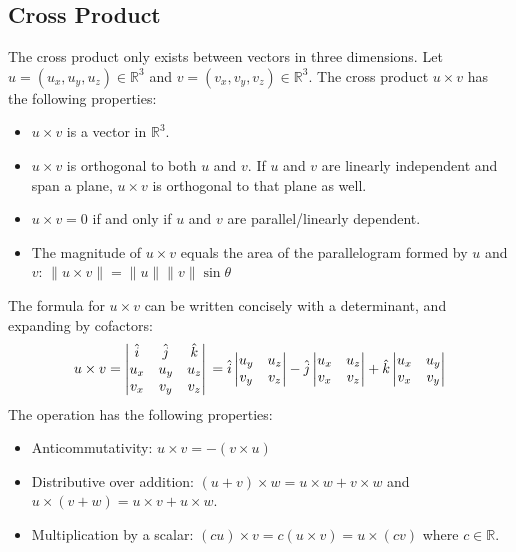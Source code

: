 \documentclass{article}
\begin{document}
\subsection{Cross Product}
The cross product only exists between vectors in three dimensions. Let $u=(u_x,u_y,u_z)\in\mathbb R^3$ and $v=(v_x,v_y,v_z)\in\mathbb R^3$. The cross product $u\times v$ has the following properties:
\begin{itemize}
	\item $u\times v$ is a vector in $\mathbb R^3$.
	\item $u\times v$ is orthogonal to both $u$ and $v$. If $u$ and $v$ are linearly independent and span a plane, $u\times v$ is orthogonal to that plane as well.
	\item $u\times v=0$ if and only if $u$ and $v$ are parallel/linearly dependent.
	\item The magnitude of $u\times v$ equals the area of the parallelogram formed by $u$ and $v$: $\lVert u\times v \rVert =\lVert u \rVert \lVert v \rVert \sin\theta$
\end{itemize}
The formula for $u\times v$ can be written concisely with a determinant, and expanding by cofactors:
\begin{equation*}
    u\times v 
	=\begin{vmatrix}
		\hat i & \hat j & \hat k \\
		u_x & u_y & u_z \\
		v_x & v_y & v_z \\
	\end{vmatrix} \\
	=\hat i \begin{vmatrix}
		u_y & u_z \\
		v_y & v_z
	\end{vmatrix}
	-\hat j \begin{vmatrix}
		u_x & u_z \\
		v_x & v_z
	\end{vmatrix}
	+\hat k \begin{vmatrix}
		u_x & u_y \\
		v_x & v_y
	\end{vmatrix}
\end{equation*}
The operation has the following properties:
\begin{itemize}
	\item Anticommutativity: $u\times v=-(v\times u)$
	\item Distributive over addition: $(u+v)\times w=u\times w+v\times w$ and $u\times(v+w)=u\times v+u\times w$.
	\item Multiplication by a scalar: $(cu)\times v=c(u\times v)=u\times(cv)$ where $c\in\mathbb R$.
\end{itemize}
\end{document}

